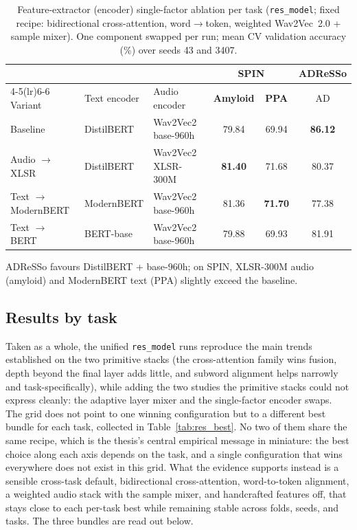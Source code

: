 \begin{table}[htbp]
\centering
\caption[Feature-extractor single-factor ablation per task]{Feature-extractor (encoder) single-factor ablation per task (\texttt{res\_model}; fixed recipe: bidirectional cross-attention, word$\rightarrow$token, weighted Wav2Vec~2.0 + sample mixer). One component swapped per run; mean CV validation accuracy (\%) over seeds 43 and 3407.}
\label{tab:res_encoder}
\small
\begin{tabular}{lllccc}
\toprule
 & & & \multicolumn{2}{c}{\textbf{SPIN}} & \textbf{ADReSSo} \\
\cmidrule(lr){4-5}\cmidrule(lr){6-6}
Variant & Text encoder & Audio encoder & \textbf{Amyloid} & \textbf{PPA} & AD \\
\midrule
Baseline              & DistilBERT & Wav2Vec2 base-960h & 79.84 & 69.94 & \textbf{86.12} \\
Audio $\to$ XLSR      & DistilBERT & Wav2Vec2 XLSR-300M & \textbf{81.40} & 71.68 & 80.37 \\
Text $\to$ ModernBERT & ModernBERT & Wav2Vec2 base-960h & 81.36 & \textbf{71.70} & 77.38 \\
Text $\to$ BERT       & BERT-base  & Wav2Vec2 base-960h & 79.88 & 69.93 & 81.91 \\
\bottomrule
\end{tabular}

\vspace{2pt}
{\footnotesize ADReSSo favours DistilBERT + base-960h; on SPIN, XLSR-300M audio (amyloid) and ModernBERT text (PPA) slightly exceed the baseline.}
\end{table}

\subsection{Results by task}
\label{ssec:res_bytask}

Taken as a whole, the unified \texttt{res\_model} runs reproduce the main trends established on the two primitive stacks (the cross-attention family wins fusion, depth beyond the final layer adds little, and subword alignment helps narrowly and task-specifically), while adding the two studies the primitive stacks could not express cleanly: the adaptive layer mixer and the single-factor encoder swaps. The grid does not point to one winning configuration but to a different best bundle for each task, collected in Table~\ref{tab:res_best}. No two of them share the same recipe, which is the thesis's central empirical message in miniature: the best choice along each axis depends on the task, and a single configuration that wins everywhere does not exist in this grid. What the evidence supports instead is a sensible cross-task default, bidirectional cross-attention, word-to-token alignment, a weighted audio stack with the sample mixer, and handcrafted features off, that stays close to each per-task best while remaining stable across folds, seeds, and tasks. The three bundles are read out below.

